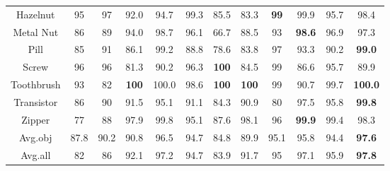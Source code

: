 \documentclass[5p, twocolumn]{elsarticle}[draft]
\begin{document}
\begin{table*}[]
{\begin{tabular}{c|ccccccccccc}
Hazelnut   & 95    & 97      & 92.0         & 94.7         & 99.3          & 85.5         & 83.3           & \textbf{99} & 99.9           & 95.7           & 98.4           \\
Metal Nut  & 86    & 89      & 94.0         & 98.7         & 96.1          & 66.7         & 88.5           & 93          & \textbf{98.6}  & 96.9           & 97.3           \\
Pill       & 85    & 91      & 86.1         & 99.2         & 88.8          & 78.6         & 83.8           & 97          & 93.3           & 90.2           & \textbf{99.0}  \\
Screw      & 96    & 96      & 81.3         & 90.2         & 96.3          & \textbf{100} & 84.5           & 99          & 86.6           & 95.7           & 89.9           \\
Toothbrush & 93    & 82      & \textbf{100} & 100.0        & 98.6          & \textbf{100} & \textbf{100}   & 99          & 90.7           & 99.7           & \textbf{100.0} \\
Transistor & 86    & 90      & 91.5         & 95.1         & 91.1          & 84.3         & 90.9           & 80          & 97.5           & 95.8           & \textbf{99.8}  \\
Zipper     & 77    & 88      & 97.9         & 99.8         & 95.1          & 87.6         & 98.1           & 96          & \textbf{99.9}  & 99.4           & 98.3           \\ \hline
Avg.obj    & 87.8  & 90.2    & 90.8         & 96.5         & 94.7          & 84.8         & 89.9           & 95.1        & 95.8           & 94.4           & \textbf{97.6}  \\ \hline
Avg.all    & 82    & 86      & 92.1         & 97.2         & 94.7          & 83.9         & 91.7           & 95          & 97.1           & 95.9           & \textbf{97.8}  \\ \hline
\end{tabular}}
\end{table*}
\end{document}
